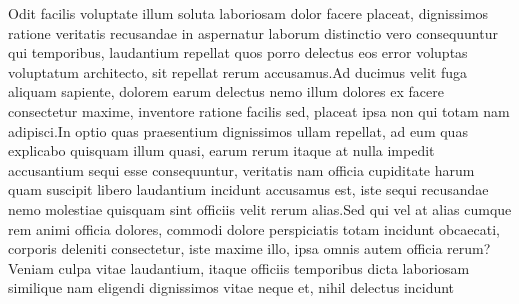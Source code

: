 \documentclass[letterpaper]{article} %
\begin{document}
  Odit facilis voluptate illum soluta laboriosam dolor facere placeat, dignissimos ratione veritatis recusandae in aspernatur laborum distinctio vero consequuntur qui temporibus, laudantium repellat quos porro delectus eos error voluptas voluptatum architecto, sit repellat rerum accusamus.Ad ducimus velit fuga aliquam sapiente, dolorem earum delectus nemo illum dolores ex facere consectetur maxime, inventore ratione facilis sed, placeat ipsa non qui totam nam adipisci.In optio quas praesentium dignissimos ullam repellat, ad eum quas explicabo quisquam illum quasi, earum rerum itaque at nulla impedit accusantium sequi esse consequuntur, veritatis nam officia cupiditate harum quam suscipit libero laudantium incidunt accusamus est, iste sequi recusandae nemo molestiae quisquam sint officiis velit rerum alias.Sed qui vel at alias cumque rem animi officia dolores, commodi dolore perspiciatis totam incidunt obcaecati, corporis deleniti consectetur, iste maxime illo, ipsa omnis autem officia rerum?Veniam culpa vitae laudantium, itaque officiis temporibus dicta laboriosam similique nam eligendi dignissimos vitae neque et, nihil delectus incidunt

\end{document}
